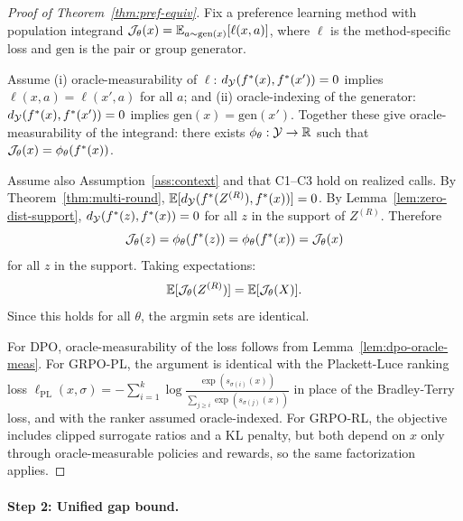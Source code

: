 \begin{proof}[Proof of Theorem~\ref{thm:pref-equiv}]
Fix a preference learning method with population integrand $\mathcal{J}_\theta(x) = \mathbb{E}_{a \sim \mathrm{gen}(x)}[\ell(x, a)]$, where $\ell$ is the method-specific loss and $\mathrm{gen}$ is the pair or group generator.

Assume (i) oracle-measurability of $\ell$: $d_{\mathcal{Y}}(f^\ast(x), f^\ast(x')) = 0$ implies $\ell(x,a) = \ell(x',a)$ for all $a$; and (ii) oracle-indexing of the generator: $d_{\mathcal{Y}}(f^\ast(x), f^\ast(x')) = 0$ implies $\mathrm{gen}(x) = \mathrm{gen}(x')$. Together these give oracle-measurability of the integrand: there exists $\phi_\theta: \mathcal{Y} \to \mathbb{R}$ such that $\mathcal{J}_\theta(x) = \phi_\theta(f^\ast(x))$.

Assume also Assumption~\ref{ass:context} and that C1--C3 hold on realized calls. By Theorem~\ref{thm:multi-round}, $\mathbb{E}[d_{\mathcal{Y}}(f^\ast(Z^{(R)}), f^\ast(x))] = 0$. By Lemma~\ref{lem:zero-dist-support}, $d_{\mathcal{Y}}(f^\ast(z), f^\ast(x)) = 0$ for all $z$ in the support of $Z^{(R)}$. Therefore
\[
\mathcal{J}_\theta(z) = \phi_\theta(f^\ast(z)) = \phi_\theta(f^\ast(x)) = \mathcal{J}_\theta(x)
\]
for all $z$ in the support. Taking expectations:
\[
\mathbb{E}[\mathcal{J}_\theta(Z^{(R)})] = \mathbb{E}[\mathcal{J}_\theta(X)].
\]
Since this holds for all $\theta$, the argmin sets are identical.

For DPO, oracle-measurability of the loss follows from Lemma~\ref{lem:dpo-oracle-meas}. For GRPO-PL, the argument is identical with the Plackett-Luce ranking loss $\ell_{\mathrm{PL}}(x, \sigma) = -\sum_{i=1}^k \log \frac{\exp(s_{\sigma(i)}(x))}{\sum_{j \ge i} \exp(s_{\sigma(j)}(x))}$ in place of the Bradley-Terry loss, and with the ranker assumed oracle-indexed. For GRPO-RL, the objective includes clipped surrogate ratios and a KL penalty, but both depend on $x$ only through oracle-measurable policies and rewards, so the same factorization applies.
\end{proof}

\paragraph{Step 2: Unified gap bound.}

